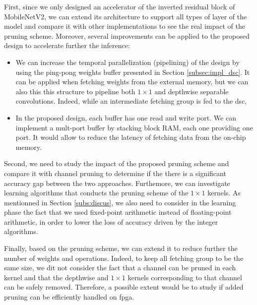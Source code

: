 First, since we only designed an accelerator of the inverted residual block of MobileNetV2, we can extend its architecture to support all types of layer of the model and compare it with other implementations to see the real impact of the pruning scheme. Moreover, several improvements can be applied to the proposed design to accelerate further the inference:
%
\begin{itemize}
    \item We can increase the temporal parallelization (pipelining) of the design by using the ping-pong weights buffer presented in Section \ref{subsec:impl_dsc}. It can be applied when fetching weights from the external memory, but we can also this this structure to pipeline both $1 \times 1$ and depthwise separable convolutions. Indeed, while an intermediate fetching group is fed to the \acrshort{dsc}, 
    \item In the proposed design, each buffer has one read and write port. We can implement a mult-port buffer by stacking block RAM, each one providing one port. It would allow to reduce the latency of fetching data from the on-chip memory.
\end{itemize}
%
Second, we need to study the impact of the proposed pruning scheme and compare it with channel pruning to determine if the there is a significant accuracy gap between the two approaches. Furthemore, we can investigate learning algorithms that conducts the pruning scheme of the $1 \times 1$ kernels. As mentionned in Section \ref{subs:discus}, we also need to consider in the learning phase the fact that we used fixed-point arithmetic instead of floating-point arithmetic, in order to lower the loss of accuracy driven by the integer algorithms.

Finally, based on the pruning scheme, we can extend it to reduce further the number of weights and operations. Indeed, to keep all fetching group to be the same size, we dit not consider the fact that a channel can be pruned in each kernel and that the depthwise and $1 \times 1$ kernels corresponding to that channel can be safely removed. Therefore, a possible extent would be to study if added pruning can be efficiently handled on \acrshort{fpga}.
\afterpage{\blankpage}
\newpage
